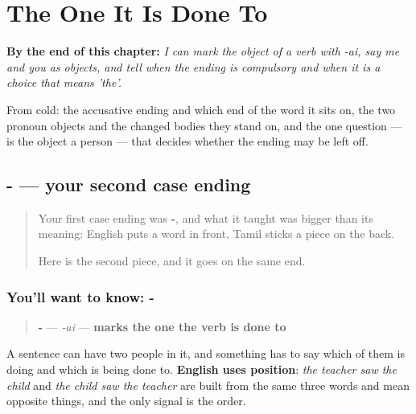 
\chapter{The One It Is Done To}
\label{ch:ta-ai}

\begin{chapteropening}
\textbf{By the end of this chapter:} \emph{I can mark the object of a verb with -ai, say me and you as objects, and tell when the ending is compulsory and when it is a choice that means 'the'.}

From cold: the accusative ending and which end of the word it sits on, the two pronoun objects and the changed bodies they stand on, and the one question — is the object a person — that decides whether the ending may be left off.
\end{chapteropening}

\section[\texorpdfstring{-\ta{ஐ} (-ai)}{-ஐ (-ai)}]{- — your second case ending}

\label{lesson:TA-C86-ai}



\begin{quote}
Your first case ending was \textbf{-}, and what it taught was bigger than its meaning: English puts a word in front, Tamil sticks a piece on the back.

Here is the second piece, and it goes on the same end.
\end{quote}

\subsection*{You'll want to know: -}
\begin{quote}
\textbf{-} — \emph{-ai} — \textbf{marks the one the verb is done to}
\end{quote}

A sentence can have two people in it, and something has to say which of them is doing and which is being done to. \textbf{English uses position}: \emph{the teacher saw the child} and \emph{the child saw the teacher} are built from the same three words and mean opposite things, and the only signal is the order.


